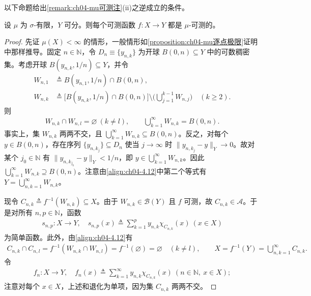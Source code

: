 \documentclass[../../main.tex]{subfiles}%
\begin{document}
以下命题给出\cref{remark:ch04-mu可测注}(ii)之逆成立的条件。

\begin{proposition}\label{proposition:ch04-可推mu可}
设 $\mu$ 为 $\sigma$-有限，$Y$ 可分。则每个可测函数 $f:X\to Y$ 都是 $\mu$-可测的。
\end{proposition}

\begin{proof}
先证 $\mu(X)<\infty$ 的情形，一般情形如\cref{proposition:ch04-mu逐点极限}证明中那样推导。固定 $n\in\mathbb{N}$，令 $D_n\equiv\{y_{n,k}\}$ 为开球 $B(0,n)\subseteq Y$ 中的可数稠密集。考虑开球 $B(y_{n,k},1/n)\subseteq Y$，并令
\begin{align*}
W_{n,1}&\triangleq B(y_{n,1},1/n)\cap B(0,n),\\
W_{n,k}&\triangleq \big[B(y_{n,k},1/n)\cap B(0,n)\big]\setminus\Big(\bigcup_{j=1}^{k-1}W_{n,j}\Big)\quad(k\geqslant2).
\end{align*}
则
\begin{align}
W_{n,k}\cap W_{n,l}=\varnothing \ (k\neq l),\qquad \bigcup_{k=1}^\infty W_{n,k}=B(0,n). \label{align:ch04-4.12}
\end{align}
事实上，集 $W_{n,k}$ 两两不交，且 $\bigcup_{k=1}^\infty W_{n,k}\subseteq B(0,n)$。反之，对每个 $y\in B(0,n)$，存在序列 $\{y_{n,k_j}\}\subseteq D_n$ 使当 $j\to\infty$ 时 $\|y_{n,k_j}-y\|_Y\to0$。故对某个 $j_0\in\mathbb{N}$ 有 $\|y_{n,k_{j_0}}-y\|_Y<1/n$，即 $y\in\bigcup_{k=1}^\infty W_{n,k}$。因此 $\bigcup_{k=1}^\infty W_{n,k}\supseteq B(0,n)$。注意由\eqref{align:ch04-4.12}中第二个等式有 $Y=\bigcup_{n,k=1}^\infty W_{n,k}$。

现令 $C_{n,k}\triangleq f^{-1}(W_{n,k})\subseteq X$。由于 $W_{n,k}\in\mathcal{B}(Y)$ 且 $f$ 可测，故 $C_{n,k}\in\mathcal{A}$。于是对所有 $n,p\in\mathbb{N}$，函数
\begin{align*}
s_{n,p}:X\to Y,\quad s_{n,p}(x)\triangleq \sum_{k=1}^p y_{n,k}\chi_{C_{n,k}}(x)\ (x\in X)
\end{align*}
为简单函数。此外，由\eqref{align:ch04-4.12}有
\begin{align*}
C_{n,k}\cap C_{n,l}=f^{-1}(W_{n,k}\cap W_{n,l})=f^{-1}(\varnothing )=\varnothing \quad(k\neq l),\qquad
X=f^{-1}(Y)=\bigcup_{n,k=1}^\infty C_{n,k}.
\end{align*}
令
\begin{align*}
f_n:X\to Y,\quad f_n(x)\triangleq \sum_{k=1}^\infty y_{n,k}\chi_{C_{n,k}}(x)\ (n\in\mathbb{N},\ x\in X);
\end{align*}
注意对每个 $x\in X$，上述和退化为单项，因为集 $C_{n,k}$ 两两不交。


\end{proof}
\end{document}
